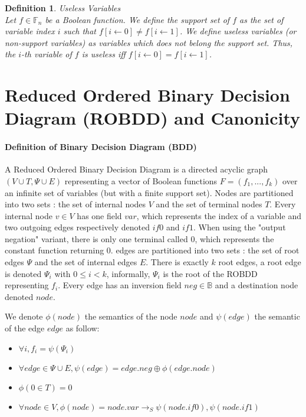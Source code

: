 \documentclass[a4paper,10pt]{article}
\newcommand{\shannon}[3]{#1 \longrightarrow_S #2, #3}
\newcommand{\B}{\mathbb{B}}
\newcommand{\F}{\mathbb{F}}
\newtheorem{newdef}{Definition}
\newcommand{\definition}[2]{\begin{newdef}{#1\\}#2\end{newdef}}
\begin{document}

\definition{Useless Variables}
{
Let $f\in\F_n$ be a Boolean function.
We define the support set of $f$ as the set of variable index $i$ such that $f[i\leftarrow 0] \neq f[i\leftarrow 1]$.
We define useless variables (or non-support variables) as variables which does not belong the support set.
Thus, the $i$-th variable of $f$ is useless iff $f[i\leftarrow 0] = f[i\leftarrow 1]$.
}

\section{Reduced Ordered Binary Decision Diagram (ROBDD) and Canonicity}

\paragraph{Definition of Binary Decision Diagram (BDD)\\}

A Reduced Ordered Binary Decision Diagram is a directed acyclic graph $(V\cup T, \Psi \cup E)$ representing a vector of Boolean functions $F=(f_1, ..., f_k)$ over an infinite set of variables (but with a finite support set).
Nodes are partitioned into two sets : the set of internal nodes $V$ and the set of terminal nodes $T$.
Every internal node $v\in V$ has one field $\mathit{var}$, which represents the index of a variable and two outgoing edges respectively denoted $\mathit{if0}$ and $\mathit{if1}$.
When using the "output negation" variant, there is only one terminal called 0, which represents the constant function returning 0.
edges are partitioned into two sets : the set of root edges $\Psi$ and the set of internal edges $E$.
There is exactly $k$ root edges, a root edge is denoted $\Psi_i$ with $0\leq i < k$, informally, $\Psi_i$ is the root of the ROBDD representing $f_i$.
Every edge has an inversion field $neg \in \B$ and a destination node denoted $\mathit{node}$.


We denote $\phi(node)$ the semantics of the node $node$ and $\psi(edge)$ the semantic of the edge $edge$ as follow:\begin{itemize}
\item $\forall i, f_i = \psi(\Psi_i)$
\item $\forall edge \in \Psi \cup E, \psi(edge) = edge.neg \oplus \phi(edge.\mathit{node})$
\item $\phi(0 \in T) = 0$
\item $\forall node \in V, \phi(node) = \shannon{node.\mathit{var}}{\psi(node.\mathit{if0})}{\psi(node.\mathit{if1})}$
\end{itemize}
\end{document}
